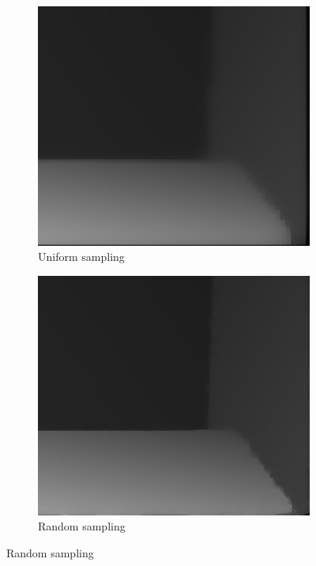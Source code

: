 \documentclass[preprint,10pt,5p,times,twocolumn]{elsarticle}
\begin{document}
\begin{figure}[t]
\begin{subfigure}[t]{0.32\linewidth}
\includegraphics[width=\linewidth]{recon_grid.png}
\caption{Uniform sampling}
\label{fig:grid}
\end{subfigure}
\begin{subfigure}[t]{0.32\linewidth}
\includegraphics[width=\linewidth]{recon_random.png}
\caption{Random sampling}
\label{fig:random}
\end{subfigure}

\end{figure}
\end{document}
